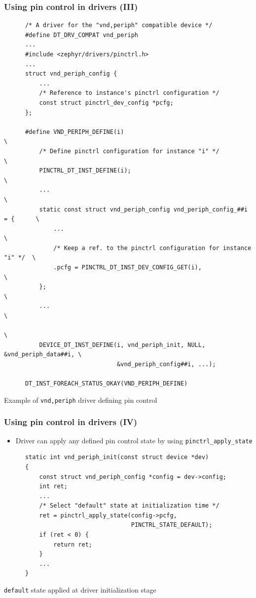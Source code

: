 \documentclass[handout]{beamer}
\begin{document}
\begin{frame}[fragile]
  \frametitle{Using pin control in drivers (III)}
  \begin{listing}[H]
    \begin{verbatim}
      /* A driver for the "vnd,periph" compatible device */
      #define DT_DRV_COMPAT vnd_periph
      ...
      #include <zephyr/drivers/pinctrl.h>
      ...
      struct vnd_periph_config {
          ...
          /* Reference to instance's pinctrl configuration */
          const struct pinctrl_dev_config *pcfg;
      };

      #define VND_PERIPH_DEFINE(i)                                             \
          /* Define pinctrl configuration for instance "i" */                  \
          PINCTRL_DT_INST_DEFINE(i);                                           \
          ...                                                                  \
          static const struct vnd_periph_config vnd_periph_config_##i = {      \
              ...                                                              \
              /* Keep a ref. to the pinctrl configuration for instance "i" */  \
              .pcfg = PINCTRL_DT_INST_DEV_CONFIG_GET(i),                       \
          };                                                                   \
          ...                                                                  \
                                                                               \
          DEVICE_DT_INST_DEFINE(i, vnd_periph_init, NULL, &vnd_periph_data##i, \
                                &vnd_periph_config##i, ...);

      DT_INST_FOREACH_STATUS_OKAY(VND_PERIPH_DEFINE)
    \end{verbatim}
    \caption{Example of \texttt{vnd,periph} driver defining pin control}
  \end{listing}
\end{frame}

\begin{frame}[fragile]
  \frametitle{Using pin control in drivers (IV)}

  \begin{itemize}
    \item<1-> Driver can apply any defined pin control state by using
        \texttt{pinctrl\_apply\_state}
  \end{itemize}

  \begin{listing}[H]
    \begin{verbatim}
      static int vnd_periph_init(const struct device *dev)
      {
          const struct vnd_periph_config *config = dev->config;
          int ret;
          ...
          /* Select "default" state at initialization time */
          ret = pinctrl_apply_state(config->pcfg,
                                    PINCTRL_STATE_DEFAULT);
          if (ret < 0) {
              return ret;
          }
          ...
      }
    \end{verbatim}
    \caption{\texttt{default} state applied at driver initialization stage}
  \end{listing}
\end{frame}
\end{document}
